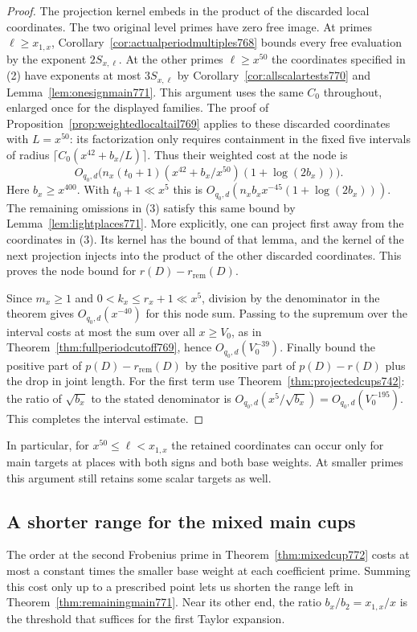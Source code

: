 \documentclass[a4paper,11pt]{article}
\theoremstyle{definition}
\theoremstyle{remark}
\numberwithin{equation}{section}
\begin{document}
\begin{proof}
The projection kernel embeds in the product of the
discarded local coordinates. The two original level primes
have zero free image. At primes \(\ell\ge x_{1,x}\),
Corollary~\ref{cor:actualperiodmultiples768} bounds every
free evaluation by the exponent \(2S_{x,\ell}\). At the
other primes \(\ell\ge x^{50}\) the coordinates specified
in (2) have exponents at most \(3S_{x,\ell}\) by
Corollary~\ref{cor:allscalartests770} and
Lemma~\ref{lem:onesignmain771}. This argument uses the
same \(C_0\) throughout, enlarged once for the displayed
families. The proof of Proposition~\ref{prop:weightedlocaltail769}
applies to these discarded coordinates with \(L=x^{50}\):
its factorization only requires containment in the fixed
five intervals of radius \(\lceil C_0(x^{42}+b_x/L)\rceil\).
Thus their weighted cost at the node is
\[
 O_{q_0,d}\big(n_x(t_0+1)(x^{42}+b_x/x^{50})
                              (1+\log(2b_x))\big).
\]
Here \(b_x\ge x^{400}\). With \(t_0+1\ll x^5\) this is
\(O_{q_0,d}(n_x b_x x^{-45}(1+\log(2b_x)))\).
The remaining omissions in (3) satisfy this same bound
by Lemma~\ref{lem:lightplaces771}. More explicitly, one
can project first away from the coordinates in (3).
Its kernel has the bound of that lemma, and the kernel
of the next projection injects into the product of the
other discarded coordinates. This proves the node bound
for \(r(D)-r_{\mathrm{rem}}(D)\).

Since \(m_x\ge1\) and \(0<k_x\le r_x+1\ll x^5\), division
by the denominator in the theorem gives \(O_{q_0,d}(x^{-40})\)
for this node sum. Passing to the supremum over the interval
costs at most the sum over all \(x\ge V_0\), as in
Theorem~\ref{thm:fullperiodcutoff769}, hence
\(O_{q_0,d}(V_0^{-39})\). Finally bound the positive part
of \(p(D)-r_{\mathrm{rem}}(D)\) by the positive part of
\(p(D)-r(D)\) plus the drop in joint length. For the first
term use Theorem~\ref{thm:projectedcups742}: the ratio of
\(\sqrt{b_x}\) to the stated denominator is
\(O_{q_0,d}(x^5/\sqrt{b_x})=O_{q_0,d}(V_0^{-195})\).
This completes the interval estimate.
\end{proof}
In particular, for \(x^{50}\le\ell<x_{1,x}\) the retained
coordinates can occur only for main targets at places with
both signs and both base weights. At smaller primes this
argument still retains some scalar targets as well.
\clearpage

\subsection{A shorter range for the mixed main cups}
\label{sec:mixedrange773}
The order at the second Frobenius prime in
Theorem~\ref{thm:mixedcup772} costs at most a constant times
the smaller base weight at each coefficient prime. Summing
this cost only up to a prescribed point lets us shorten
the range left in Theorem~\ref{thm:remainingmain771}.
Near its other end, the ratio \(b_x/b_2=x_{1,x}/x\) is the
threshold that suffices for the first Taylor expansion.
\end{document}
